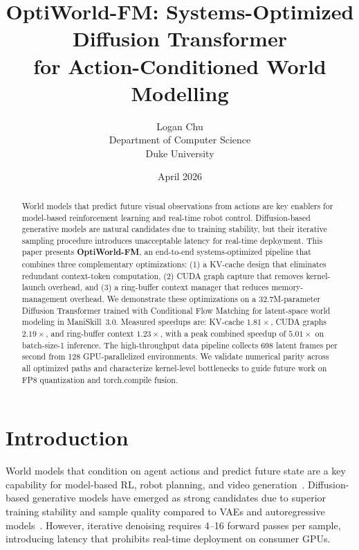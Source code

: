 \documentclass[letterpaper,twocolumn,10pt]{article}
\title{\textbf{OptiWorld-FM}: Systems-Optimized Diffusion Transformer\\
for Action-Conditioned World Modelling}
\author{
Logan Chu\\
Department of Computer Science\\
Duke University
}
\date{April 2026}
\begin{document}
\maketitle

\begin{abstract}

World models that predict future visual observations from actions are key
enablers for model-based reinforcement learning and real-time robot
control.  Diffusion-based generative models are natural candidates due to
training stability, but their iterative sampling procedure introduces
unacceptable latency for real-time deployment.  This paper presents
\textbf{OptiWorld-FM}, an end-to-end systems-optimized pipeline that
combines three complementary optimizations: (1) a KV-cache design that
eliminates redundant context-token computation, (2) CUDA graph capture
that removes kernel-launch overhead, and (3) a ring-buffer context
manager that reduces memory-management overhead.  We demonstrate these
optimizations on a 32.7M-parameter Diffusion Transformer trained with
Conditional Flow Matching for latent-space world modeling in
ManiSkill~3.0.  Measured speedups are: KV-cache $1.81\times$, CUDA
graphs $2.19\times$, and ring-buffer context $1.23\times$, with a peak
combined speedup of $5.01\times$ on batch-size-1 inference.  The
high-throughput data pipeline collects 698 latent frames per second from
128 GPU-parallelized environments.  We validate numerical parity across
all optimized paths and characterize kernel-level bottlenecks to guide
future work on FP8 quantization and torch.compile fusion.

\end{abstract}

\section{Introduction}

World models that condition on agent actions and predict future state
are a key capability for model-based RL, robot planning, and
video generation~\cite{dreamer2020, unisim2021}.  Diffusion-based
generative models have emerged as strong candidates due to superior
training stability and sample quality compared to VAEs and
autoregressive models~\cite{ho2020ddpm, song2021sde}.  However, iterative
denoising requires 4--16 forward passes per sample, introducing latency
that prohibits real-time deployment on consumer GPUs.
\end{document}
